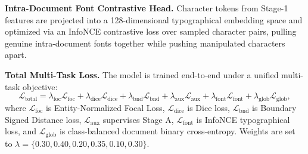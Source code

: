 \noindent\textbf{Intra-Document Font Contrastive Head.}
Character tokens from Stage-1 features are projected into a 128-dimensional typographical embedding space and optimized via an InfoNCE contrastive loss over sampled character pairs, pulling genuine intra-document fonts together while pushing manipulated characters apart.

\noindent\textbf{Total Multi-Task Loss.}
The model is trained end-to-end under a unified multi-task objective:
\begin{equation}
    \mathcal{L}_{\text{total}} = \lambda_{\text{foc}} \mathcal{L}_{\text{foc}} + \lambda_{\text{dice}} \mathcal{L}_{\text{dice}} + \lambda_{\text{bnd}} \mathcal{L}_{\text{bnd}} + \lambda_{\text{aux}} \mathcal{L}_{\text{aux}} + \lambda_{\text{font}} \mathcal{L}_{\text{font}} + \lambda_{\text{glob}} \mathcal{L}_{\text{glob}},
\end{equation}
where $\mathcal{L}_{\text{foc}}$ is Entity-Normalized Focal Loss, $\mathcal{L}_{\text{dice}}$ is Dice loss, $\mathcal{L}_{\text{bnd}}$ is Boundary Signed Distance loss, $\mathcal{L}_{\text{aux}}$ supervises Stage A, $\mathcal{L}_{\text{font}}$ is InfoNCE typographical loss, and $\mathcal{L}_{\text{glob}}$ is class-balanced document binary cross-entropy. Weights are set to $\lambda = \{0.30, 0.40, 0.20, 0.35, 0.10, 0.30\}$.

